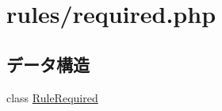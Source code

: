 \hypertarget{required_8php}{
\section{rules/required.php}
\label{required_8php}
}
\subsection*{データ構造}
\begin{DoxyCompactItemize}
\item 
class \hyperlink{class_rule_required}{\-Rule\-Required}
\end{DoxyCompactItemize}
